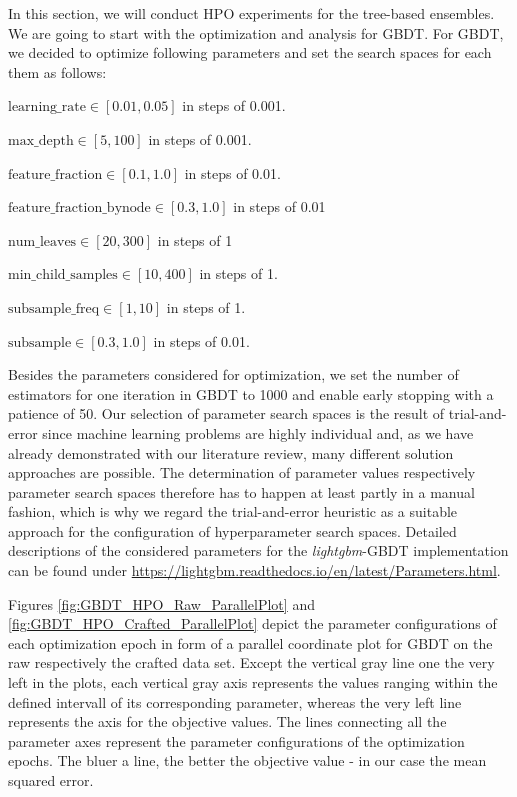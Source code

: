 In this section, we will conduct HPO experiments for the tree-based ensembles. 
We are going to start with the optimization and analysis for GBDT.
For GBDT, we decided to optimize following parameters and set the search spaces for each them as follows:
\begin{description}[font=$\bullet$\scshape\bfseries]
	\item $ \text{learning\_rate} \in [0.01, 0.05] $  in steps of 0.001.
	\item $ \text{max\_depth} \in [5, 100] $ in steps of 0.001.
	\item $ \text{feature\_fraction} \in [0.1, 1.0] $ in steps of 0.01.
	\item $ \text{feature\_fraction\_bynode} \in [0.3, 1.0] $ in steps of 0.01
	\item $ \text{num\_leaves} \in [20, 300] $ in steps of 1
	\item $ \text{min\_child\_samples} \in [10, 400] $ in steps of 1.
	\item $ \text{subsample\_freq} \in [1, 10] $ in steps of 1.
	\item $ \text{subsample} \in [0.3, 1.0] $ in steps of 0.01.
\end{description}
Besides the parameters considered for optimization, we set the number of estimators for one iteration in GBDT to 1000 and enable early stopping with a patience of 50. Our selection of parameter search spaces is the result of trial-and-error since machine learning problems are highly individual and, as we have already demonstrated with our literature review, many different solution approaches are possible. The determination of parameter values respectively parameter search spaces therefore has to happen at least partly in a manual fashion, which is why we regard the trial-and-error heuristic as a suitable approach for the configuration of hyperparameter search spaces. Detailed descriptions of the considered parameters for the \textit{lightgbm}-GBDT implementation can be found under \url{https://lightgbm.readthedocs.io/en/latest/Parameters.html}.

Figures \ref{fig:GBDT_HPO_Raw_ParallelPlot} and \ref{fig:GBDT_HPO_Crafted_ParallelPlot} depict the parameter configurations of each optimization epoch in form of a parallel coordinate plot for GBDT on the raw respectively the crafted data set. Except the vertical gray line one the very left in the plots, each vertical gray axis represents the values ranging within the defined intervall of its corresponding parameter, whereas the very left line represents the axis for the objective values. The lines connecting all the parameter axes represent the parameter configurations of the optimization epochs. The bluer a line, the better the objective value - in our case the mean squared error. 

